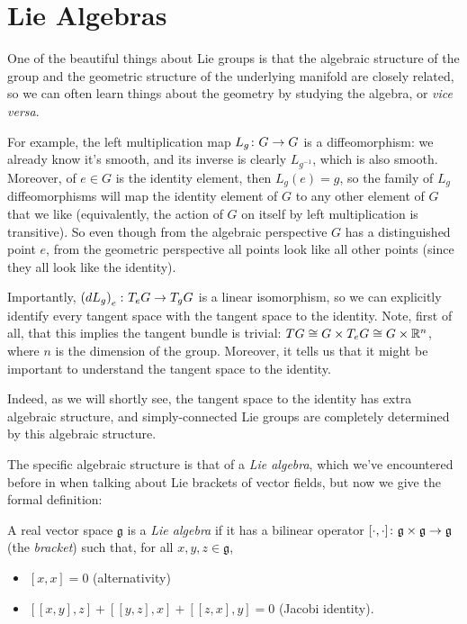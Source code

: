 
\section{Lie Algebras}
\label{sec:Lie algebras}

One of the beautiful things about Lie groups is that the algebraic structure of the group and the geometric structure of the underlying manifold are closely related, so we can often learn things about the geometry by studying the algebra, or \emph{vice versa}.

For example, the left multiplication map $L_g \colon\thinspace\! G \to G$ is a diffeomorphism: we already know it's smooth, and its inverse is clearly $L_{g^{-1}}$, which is also smooth. Moreover, of $e \in G$ is the identity element, then $L_g(e) = g$, so the family of $L_g$ diffeomorphisms will map the identity element of $G$ to any other element of $G$ that we like (equivalently, the action of $G$ on itself by left multiplication is transitive). So even though from the algebraic perspective $G$ has a distinguished point $e$, from the geometric perspective all points look like all other points (since they all look like the identity).

Importantly, $\left(dL_g\right)_e \colon\thinspace\! T_eG \to T_g G$ is a linear isomorphism, so we can explicitly identify every tangent space with the tangent space to the identity. Note, first of all, that this implies the tangent bundle is trivial: $TG \cong G \times T_e G \cong G \times \mathbb{R}^n$, where $n$ is the dimension of the group. Moreover, it tells us that it might be important to understand the tangent space to the identity.

Indeed, as we will shortly see, the tangent space to the identity has extra algebraic structure, and simply-connected Lie groups are completely determined by this algebraic structure.

The specific algebraic structure is that of a \emph{Lie algebra}, which we've encountered before in  when talking about Lie brackets of vector fields, but now we give the formal definition:

\begin{definition}\label{def:Lie algebra}
	A real vector space $\mathfrak{g}$ is a \emph{Lie algebra} if it has a bilinear operator $[ \cdot , \cdot ] \colon\thinspace\! \mathfrak{g} \times \mathfrak{g} \to \mathfrak{g}$ (the \emph{bracket}) such that, for all $x,y,z \in \mathfrak{g}$,
	\begin{itemize}
		\item $[x,x] = 0$ (alternativity)
		\item $[[x,y],z] + [[y,z],x]+ [[z,x],y]=0$ (Jacobi identity).
	\end{itemize}
\end{definition}

